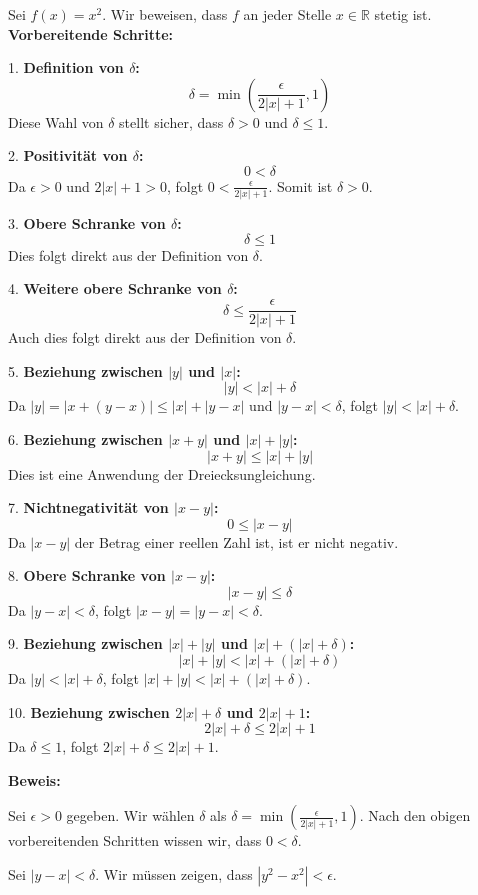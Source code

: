 \documentclass{article}
\begin{document}
Sei $f(x) = x^2$. Wir beweisen, dass $f$ an jeder Stelle $x \in \mathbb{R}$ stetig ist. 
\textbf{Vorbereitende Schritte:}

1. \textbf{Definition von $\delta$:}
   \[
   \delta = \min\left(\frac{\epsilon}{2|x| + 1}, 1\right)
   \]
   Diese Wahl von $\delta$ stellt sicher, dass $\delta > 0$ und $\delta \leq 1$.

2. \textbf{Positivität von $\delta$:}
   \[
   0 < \delta
   \]
   Da $\epsilon > 0$ und $2|x| + 1 > 0$, folgt $0 < \frac{\epsilon}{2|x| + 1}$. Somit ist $\delta > 0$.

3. \textbf{Obere Schranke von $\delta$:}
   \[
   \delta \leq 1
   \]
   Dies folgt direkt aus der Definition von $\delta$.

4. \textbf{Weitere obere Schranke von $\delta$:}
   \[
   \delta \leq \frac{\epsilon}{2|x| + 1}
   \]
   Auch dies folgt direkt aus der Definition von $\delta$.

5. \textbf{Beziehung zwischen $|y|$ und $|x|$:}
   \[
   |y| < |x| + \delta
   \]
   Da $|y| = |x + (y - x)| \leq |x| + |y - x|$ und $|y - x| < \delta$, folgt $|y| < |x| + \delta$.

6. \textbf{Beziehung zwischen $|x + y|$ und $|x| + |y|$:}
   \[
   |x + y| \leq |x| + |y|
   \]
   Dies ist eine Anwendung der Dreiecksungleichung.

7. \textbf{Nichtnegativität von $|x - y|$:}
   \[
   0 \leq |x - y|
   \]
   Da $|x - y|$ der Betrag einer reellen Zahl ist, ist er nicht negativ.

8. \textbf{Obere Schranke von $|x - y|$:}
   \[
   |x - y| \leq \delta
   \]
   Da $|y - x| < \delta$, folgt $|x - y| = |y - x| < \delta$.

9. \textbf{Beziehung zwischen $|x| + |y|$ und $|x| + (|x| + \delta)$:}
   \[
   |x| + |y| < |x| + (|x| + \delta)
   \]
   Da $|y| < |x| + \delta$, folgt $|x| + |y| < |x| + (|x| + \delta)$.

10. \textbf{Beziehung zwischen $2|x| + \delta$ und $2|x| + 1$:}
    \[
    2|x| + \delta \leq 2|x| + 1
    \]
    Da $\delta \leq 1$, folgt $2|x| + \delta \leq 2|x| + 1$.

\textbf{Beweis:}

Sei $\epsilon > 0$ gegeben. Wir wählen $\delta$ als $\delta = \min\left(\frac{\epsilon}{2|x| + 1}, 1\right)$. Nach den obigen vorbereitenden Schritten wissen wir, dass $0 < \delta$.

Sei $|y - x| < \delta$. Wir müssen zeigen, dass $|y^2 - x^2| < \epsilon$.
\end{document}
